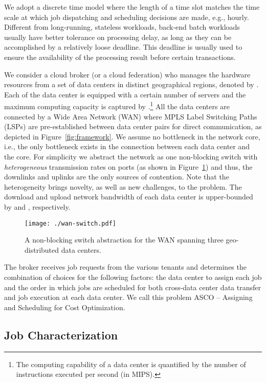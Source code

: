 \documentclass{article}
\begin{document}
We adopt a discrete time model where the length of a time slot matches the time scale at which job dispatching and scheduling decisions are made, e.g., hourly. Different from long-running, stateless workloads, back-end batch workloads usually have better tolerance on processing delay, as long as they can be accomplished by a relatively loose deadline. This deadline is usually used to ensure the availability of the processing result before certain transactions.

We consider a cloud broker (or a cloud federation) who manages the hardware resources from a set of  data centers in distinct geographical regions, denoted by . Each of the data center  is equipped with a certain number of servers and the maximum computing capacity is captured by .\footnote{The computing capability of a data center is quantified by the number of instructions executed per second (in MIPS).} All the data centers are connected by a Wide Area Network (WAN) where MPLS Label Switching Paths (LSPs) are pre-established between data center pairs for direct communication, as depicted in Figure~\ref{fig:framework}. We assume no bottleneck in the network core, i.e., the only bottleneck exists in the connection between each data center and the core. For simplicity we abstract the network as one non-blocking switch with \emph{heterogeneous} transmission rates on ports (as shown in Figure~\ref{fig:wan-switch}) and thus, the downlinks and uplinks are the only sources of contention. Note that the heterogeneity brings novelty, as well as new challenges, to the problem. The download and upload network bandwidth of each data center  is upper-bounded by  and , respectively.

\begin{figure}
\centering
\texttt{[image: ./wan-switch.pdf]}
\caption{\label{fig:wan-switch} A non-blocking switch abstraction for the WAN spanning three geo-distributed data centers. }
\end{figure}

The broker receives job requests from the various tenants and determines the combination of choices for the following factors: the data center to assign each job and the order in which jobs are scheduled for both cross-data center data transfer and job execution at each data center. We call this problem ASCO -- Assigning and Scheduling for Cost Optimization.

\subsection{Job Characterization}
\end{document}
